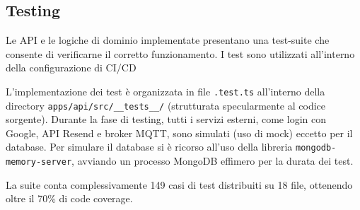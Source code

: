 
\subsection{Testing}
Le API e le logiche di dominio implementate presentano una test-suite che consente di verificarne il corretto funzionamento. I test sono utilizzati all'interno della configurazione di CI/CD

L'implementazione dei test è organizzata in file \texttt{.test.ts} all'interno della directory \newline
\texttt{apps/api/src/\_\_tests\_\_/} (strutturata specularmente al codice sorgente). 
Durante la fase di testing, tutti i servizi esterni, come login con Google, API Resend e broker MQTT, sono simulati (uso di mock) eccetto per il database. Per simulare il database si è ricorso all'uso della libreria \texttt{mongodb-memory-server}, avviando un processo MongoDB effimero per la durata dei test.

La suite conta complessivamente 149 casi di test distribuiti su 18 file, ottenendo oltre il 70\% di code coverage.

\begingroup
\scriptsize
\setlength{\tabcolsep}{2.5pt}
\renewcommand{\arraystretch}{1.2}

